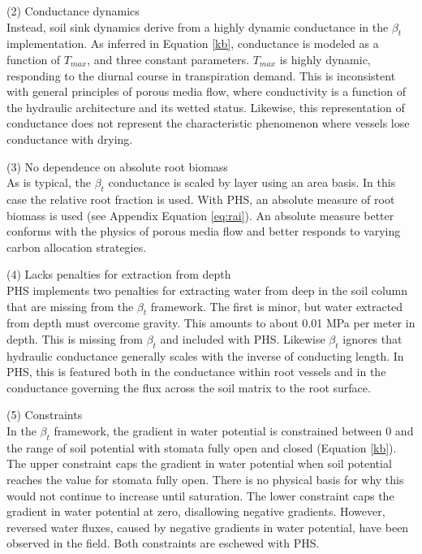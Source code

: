 \documentclass[draft,linenumbers]{agujournal}
\begin{document}
    (2) Conductance dynamics \\
    Instead, soil sink dynamics derive from a highly dynamic conductance in the $\beta_t$ implementation.
    As inferred in Equation \ref{kb}, conductance is modeled as a function of $T_{max}$, and three constant parameters.
    $T_{max}$ is highly dynamic, responding to the diurnal course in transpiration demand.
    This is inconsistent with general principles of porous media flow, where conductivity is a function of the hydraulic architecture and its wetted status.
    Likewise, this representation of conductance does not represent the characteristic phenomenon where vessels lose conductance with drying.
      
    (3) No dependence on absolute root biomass \\
    As is typical, the $\beta_t$ conductance is scaled by layer using an area basis.
    In this case the relative root fraction is used.
    With PHS, an absolute measure of root biomass is used (see Appendix Equation \ref{eq:rai}).
    An absolute measure better conforms with the physics of porous media flow and better responds to varying carbon allocation strategies.

    (4) Lacks penalties for extraction from depth \\
    PHS implements two penalties for extracting water from deep in the soil column that are missing from the $\beta_t$ framework.
    The first is minor, but water extracted from depth must overcome gravity. This amounts to about 0.01 MPa per meter in depth. 
    This is missing from $\beta_t$ and included with PHS. 
    Likewise $\beta_t$ ignores that hydraulic conductance generally scales with the inverse of conducting length.
    In PHS, this is featured both in the conductance within root vessels and 
    in the conductance governing the flux across the soil matrix to the root surface.
    
    (5) Constraints \\
    In the $\beta_t$ framework, the gradient in water potential is constrained between 0 and 
    the range of soil potential with stomata fully open and closed (Equation \ref{kb}). 
    The upper constraint caps the gradient in water potential when soil potential reaches the value for stomata fully open.
    There is no physical basis for why this would not continue to increase until saturation.
    The lower constraint caps the gradient in water potential at zero, disallowing negative gradients.
    However, reversed water fluxes, caused by negative gradients in water potential, have been observed in the field.
    Both constraints are eschewed with PHS.
    
\end{document}
